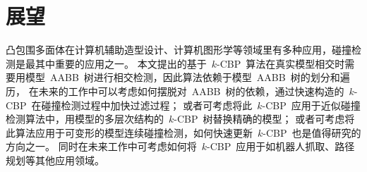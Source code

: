 \section{展望}
\label{sec:futurework}

凸包围多面体在计算机辅助造型设计、计算机图形学等领域里有多种应用，碰撞检测是最其中重要的应用之一。
本文提出的基于~$k$-CBP~算法在真实模型相交时需要用模型~AABB~树进行相交检测，因此算法依赖于模型~AABB~树的划分和遍历，
在未来的工作中可以考虑如何摆脱对~AABB~树的依赖，通过快速构造的~$k$-CBP~在碰撞检测过程中加快过滤过程；
或者可考虑将此~$k$-CBP~应用于近似碰撞检测算法中，用模型的多层次结构的~$k$-CBP~树替换精确的模型；
或者可考虑将此算法应用于可变形的模型连续碰撞检测，如何快速更新~$k$-CBP~也是值得研究的方向之一。
同时在未来工作中可考虑如何将~$k$-CBP~应用于如机器人抓取、路径规划等其他应用领域。
